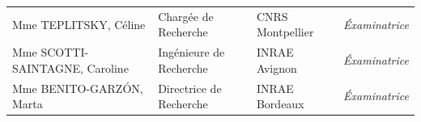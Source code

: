\begin{center}
\begin{table}[b]
{\begin{tabular}{lllr}
        Mme TEPLITSKY, Céline           & Chargée de Recherche    & CNRS Montpellier              & \emph{Éxaminatrice} \\
        Mme SCOTTI-SAINTAGNE, Caroline  & Ingénieure de Recherche & INRAE Avignon                 & \emph{Éxaminatrice} \\
        Mme BENITO-GARZÓN, Marta        & Directrice de Recherche & INRAE Bordeaux                & \emph{Éxaminatrice} \\
      \end{tabular}
    }
  \end{table}
\end{center}
